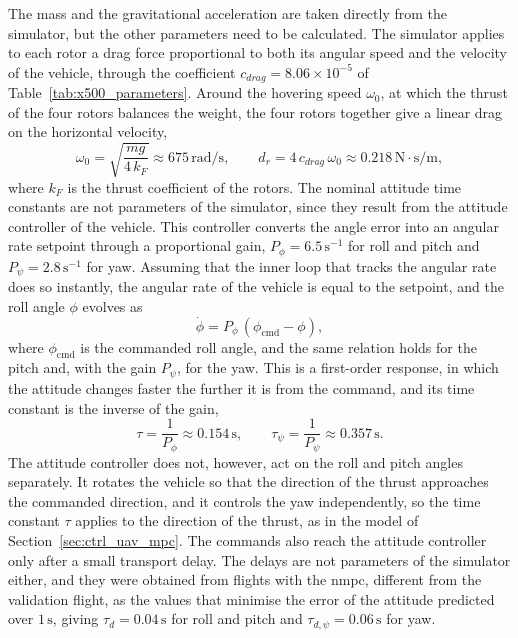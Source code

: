 The mass and the gravitational acceleration are taken directly from the simulator, but the other parameters need to be calculated. The simulator applies to each rotor a drag force proportional to both its angular speed and the velocity of the vehicle, through the coefficient $c_{drag} = 8.06\times10^{-5}$ of Table~\ref{tab:x500_parameters}. Around the hovering speed $\omega_0$, at which the thrust of the four rotors balances the weight, the four rotors together give a linear drag on the horizontal velocity,
\begin{equation}
    \omega_0 = \sqrt{\frac{mg}{4\,k_F}} \approx 675\,\text{rad/s}, \qquad d_r = 4\,c_{drag}\,\omega_0 \approx 0.218\,\text{N}\cdot\text{s}/\text{m},
    \label{eq:uav_drag_derivation}
\end{equation}
where $k_F$ is the thrust coefficient of the rotors. The nominal attitude time constants are not parameters of the simulator, since they result from the attitude controller of the vehicle. This controller converts the angle error into an angular rate setpoint through a proportional gain, $P_\phi = 6.5\,\text{s}^{-1}$ for roll and pitch and $P_\psi = 2.8\,\text{s}^{-1}$ for yaw. Assuming that the inner loop that tracks the angular rate does so instantly, the angular rate of the vehicle is equal to the setpoint, and the roll angle $\phi$ evolves as
\begin{equation}
    \dot\phi = P_\phi\,(\phi_{\mathrm{cmd}} - \phi),
    \label{eq:uav_attitude_loop}
\end{equation}
where $\phi_{\mathrm{cmd}}$ is the commanded roll angle, and the same relation holds for the pitch and, with the gain $P_\psi$, for the yaw. This is a first-order response, in which the attitude changes faster the further it is from the command, and its time constant is the inverse of the gain,
\begin{equation}
    \tau = \frac{1}{P_\phi} \approx 0.154\,\text{s}, \qquad \tau_\psi = \frac{1}{P_\psi} \approx 0.357\,\text{s}.
    \label{eq:uav_tau_nominal}
\end{equation}
The attitude controller does not, however, act on the roll and pitch angles separately. It rotates the vehicle so that the direction of the thrust approaches the commanded direction, and it controls the yaw independently, so the time constant $\tau$ applies to the direction of the thrust, as in the model of Section~\ref{sec:ctrl_uav_mpc}. The commands also reach the attitude controller only after a small transport delay. The delays are not parameters of the simulator either, and they were obtained from flights with the \gls{nmpc}, different from the validation flight, as the values that minimise the error of the attitude predicted over $1\,\text{s}$, giving $\tau_d = 0.04\,\text{s}$ for roll and pitch and $\tau_{d,\psi} = 0.06\,\text{s}$ for yaw.

